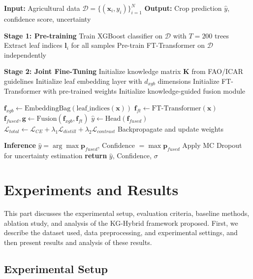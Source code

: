 \documentclass[journal]{IEEEtran}
\begin{document}
\begin{algorithm}[H]
\caption{KG-Hybrid Framework}
\label{alg:kg-hybrid}
\begin{algorithmic}[1]
\STATE \textbf{Input:} Agricultural data $\mathcal{D} = \{(\mathbf{x}_i, y_i)\}_{i=1}^{N}$
\STATE \textbf{Output:} Crop prediction $\hat{y}$, confidence score, uncertainty

\STATE \textbf{Stage 1: Pre-training}
\STATE Train XGBoost classifier on $\mathcal{D}$ with $T=200$ trees
\STATE Extract leaf indices $\mathbf{l}_i$ for all samples
\STATE Pre-train FT-Transformer on $\mathcal{D}$ independently

\STATE \textbf{Stage 2: Joint Fine-Tuning}
\STATE Initialize knowledge matrix $\mathbf{K}$ from FAO/ICAR guidelines
\STATE Initialize leaf embedding layer with $d_{xgb}$ dimensions
\STATE Initialize FT-Transformer with pre-trained weights
\STATE Initialize knowledge-guided fusion module

        \STATE $\mathbf{f}_{xgb} \leftarrow \text{EmbeddingBag}(\text{leaf\_indices}(\mathbf{x}))$
        \STATE $\mathbf{f}_{ft} \leftarrow \text{FT-Transformer}(\mathbf{x})$
        \STATE $\mathbf{f}_{fused}, \mathbf{g} \leftarrow \text{Fusion}(\mathbf{f}_{xgb}, \mathbf{f}_{ft})$
        \STATE $\hat{y} \leftarrow \text{Head}(\mathbf{f}_{fused})$
        \STATE $\mathcal{L}_{total} \leftarrow \mathcal{L}_{CE} + \lambda_1 \mathcal{L}_{distill} + \lambda_2 \mathcal{L}_{contrast}$
        \STATE Backpropagate and update weights
    \ENDFOR
\ENDFOR

\STATE \textbf{Inference}
\STATE $\hat{y} = \arg\max \mathbf{p}_{fused}$, Confidence $= \max \mathbf{p}_{fused}$
\STATE Apply MC Dropout for uncertainty estimation
\STATE \textbf{return} $\hat{y}$, Confidence, $\sigma$
\end{algorithmic}
\end{algorithm}
\section{Experiments and Results}

This part discusses the experimental setup, evaluation criteria, baseline methods, ablation study, and analysis of the KG-Hybrid framework proposed. First, we describe the dataset used, data preprocessing, and experimental settings, and then present results and analysis of these results.

\subsection{Experimental Setup}
\end{document}
